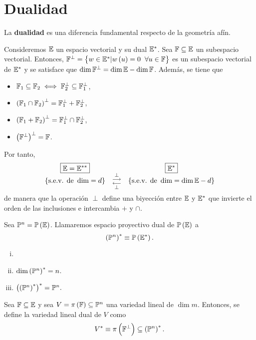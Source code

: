 \section{Dualidad}
La \textbf{dualidad} es una diferencia fundamental respecto de la geometría afín.
\begin{ej}
    Consideremos $\mathbb{E}$ un espacio vectorial y su dual $\mathbb{E}^*$. Sea $\mathbb{F} \subseteq \mathbb{E}$ un subespacio vectorial. Entonces, $\F^\perp=\left\{w \in \E ^* | w \left( u \right) = 0 \hspace{0,2cm} \forall u\in\F \right\} $ es un subespacio vectorial de $\mathbb{E}^*$ y se satisface que $\dim \mathbb{F}^\perp = \dim \mathbb{E} - \dim \mathbb{F}$. Además, se tiene que
    \begin{itemize}
        \item $\mathbb{F}_1 \subseteq \mathbb{F}_2 \iff \mathbb{F}_2^\perp \subseteq \mathbb{F}_1^\perp$,
        \item $\left( \mathbb{F}_1 \cap \mathbb{F}_2 \right) ^\perp = \mathbb{F}_1^\perp + \mathbb{F}_2^\perp$,
        \item $\left( \mathbb{F}_1 + \mathbb{F}_2 \right)^\perp=\mathbb{F}_1^\perp \cap \mathbb{F}_2^\perp$,
        \item $\left( \mathbb{F}^\perp\right)^\perp=\mathbb{F}$.
    \end{itemize}
    Por tanto,
    \[
        \begin{array}{ccc}
             \boxed{\mathbb{E} = \mathbb{E}^{**}} & & \boxed{\mathbb{E}^*}\\
             \left\{\text{s.e.v. de }\dim = d \right\} & \substack{\perp \\ \longrightarrow \\  \longleftarrow \\ \perp} & \left\{\text{s.e.v. de }\dim = \dim \mathbb{E} - d \right\}
        \end{array}
    \]
    de manera que la operación $\perp$ define una biyección entre $\mathbb{E}$ y $\mathbb{E}^*$ que invierte el orden de las inclusiones e intercambia $+$ y $\cap$.
\end{ej}
\begin{defi}
    Sea $\mathbb{P}^n=\mathbb{P}\left(\mathbb{E}\right)$. Llamaremos espacio proyectivo dual de $\mathbb{P}\left(\mathbb{E}\right)$ a
    \[
        \left( \mathbb{P}^n \right)^* \equiv \mathbb{P}\left(\mathbb{E}^*\right).
    \]
\end{defi}
\begin{obs}
    \begin{enumerate}[i)]
        \item []
        \item $\dim \left( \mathbb{P} ^n \right) ^* = n$.
        \item $\left( \left( \mathbb{P} ^n \right)^* \right) ^* = \mathbb{P}^n. $
    \end{enumerate}
\end{obs}
\begin{defi}
    Sea $\mathbb{F}\subseteq \mathbb{E}$ y sea $V=\pi\left(\mathbb{F}\right)\subseteq\mathbb{P}^n$ una variedad lineal de $\dim m$. Entonces, se define la variedad lineal dual de $V$ como
    \[
        V^* \equiv \pi \left( \mathbb{F}^\perp\right) \subseteq \left( \mathbb{P}^n \right)^*.
    \]

\end{defi}

